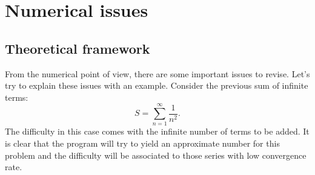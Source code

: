 \section{Numerical issues} \label{sec:NumIssues} 
 
    \subsection{Theoretical framework}
From the numerical point of view, there are some important issues to revise.  
Let's try to explain these issues with an example. 
Consider the previous sum of infinite terms: 
$$
S = \sum_{n=1} ^{\infty} \frac{ 1 } { n^2 }.
$$
The difficulty in this case comes with the infinite number of terms to be added. 
It is clear that the program  will try to yield an 
approximate number for this problem and the difficulty will be associated to those 
series with low convergence rate. 
 

